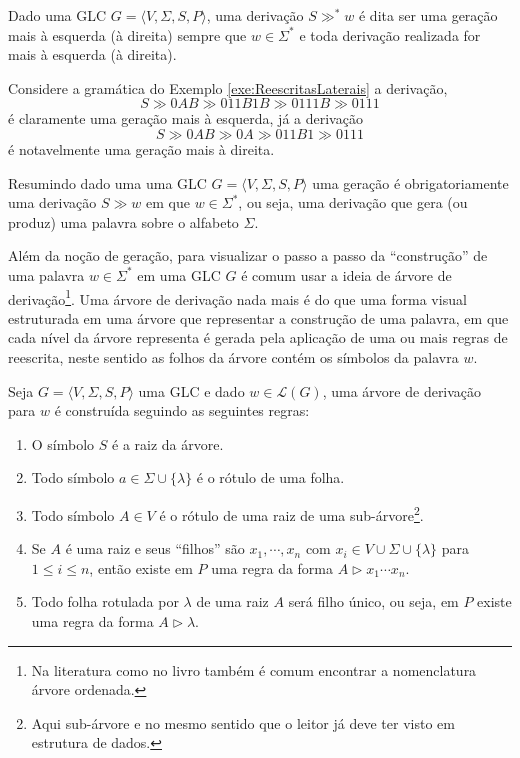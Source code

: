 \begin{definition}\label{def:TipoGeracao}
	Dado uma GLC $G = \langle V, \Sigma, S, P\rangle$,  uma derivação $S \gg^* w$ é dita ser uma geração mais à esquerda (à direita) sempre que $w \in \Sigma^*$ e toda derivação realizada for mais à esquerda (à direita).
\end{definition}

\begin{example}\label{exe:TipoGeracao}
	Considere a gramática do Exemplo \ref{exe:ReescritasLaterais} a derivação, 
	$$S \gg 0AB \gg 011B1B \gg 0111B \gg 0111$$
	é claramente uma geração mais à esquerda, já a derivação
	$$S \gg 0AB \gg 0A \gg 011B1 \gg 0111$$
	é notavelmente uma geração mais à direita.
\end{example}

\begin{remark}
  Resumindo dado uma uma GLC $G = \langle V, \Sigma, S, P\rangle$ uma geração é obrigatoriamente uma derivação $S \gg w$ em que $w \in \Sigma^*$, ou seja, uma derivação que gera (ou produz) uma palavra sobre o alfabeto $\Sigma$.
\end{remark}

Além da noção de geração, para visualizar o passo a passo da ``construção'' de uma palavra $w \in \Sigma^*$ em uma GLC $G$ é comum usar a ideia de árvore de derivação\footnote{Na literatura como no livro \cite{benjaLivro2010} também é comum encontrar a nomenclatura árvore ordenada.}. Uma árvore de derivação nada mais é do que uma forma visual estruturada em uma árvore que representar a construção de uma palavra, em que cada nível da árvore representa é gerada pela aplicação de uma ou mais regras de reescrita, neste sentido as folhos da árvore contém os símbolos da palavra $w$.

\begin{definition}\label{def:ArvoreGLC}
	Seja $G = \langle V, \Sigma, S, P\rangle$ uma GLC e dado $w \in \mathcal{L}(G)$, uma árvore de derivação para $w$ é construída seguindo as seguintes regras:
	\begin{enumerate}
		\item O símbolo $S$ é a raiz da árvore.
		\item Todo símbolo $a \in \Sigma \cup \{\lambda\}$ é o rótulo de uma folha.
		\item Todo símbolo $A \in V$ é o rótulo de uma raiz de uma sub-árvore\footnote{Aqui sub-árvore e no mesmo sentido que o leitor já deve ter visto em estrutura de dados.}.
		\item Se $A$ é uma raiz e seus ``filhos'' são  $x_1, \cdots, x_n$ com $x_i \in V \cup \Sigma \cup \{\lambda\}$ para $1 \leq i \leq n$, então existe em $P$ uma regra da forma $A \rhd x_1\cdots x_n$.
		\item Todo folha rotulada por $\lambda$ de uma raiz $A$ será filho único, ou seja, em $P$ existe uma regra da forma $A \rhd \lambda$.
	\end{enumerate}
\end{definition}

